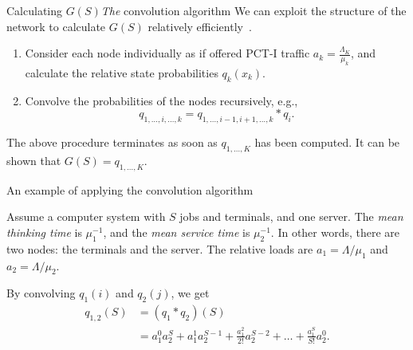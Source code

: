 \documentclass[serif, xcolor={svgnames, table}, usepdftitle=false]{beamer}
\begin{document}
\begin{frame}{Calculating $G(S)$}{\emph{The} convolution algorithm}
  We can exploit the structure of the network to calculate $G(S)$ relatively
  efficiently~\autocite{Buz73}.
  \begin{enumerate}
  \item Consider each node individually as if offered PCT-I traffic $a_k =
    \frac{\Lambda_K}{\mu_k}$, and calculate the relative state probabilities
    $q_k(x_k)$.
  \item Convolve the probabilities of the nodes recursively, e.g.,
    \begin{equation*}
      q_{1,\ldots,i,\ldots,k} = q_{1,\ldots,i - 1,i + 1,\ldots,k} \ast q_i\text{.}
    \end{equation*}
  \end{enumerate}
  The above procedure terminates as soon as $q_{1, \ldots, K}$ has been
  computed.  It can be shown that $G(S) = q_{1, \ldots, K}$.
\end{frame}

\begin{frame}{An example of applying the convolution algorithm}
  \begin{example}
    Assume a computer system with $S$ jobs and terminals, and one server.  The
    \emph{mean thinking time} is $\mu_1^{-1}$, and the \emph{mean service time}
    is $\mu_2^{-1}$.  In other words, there are two nodes: the terminals and the
    server.  The relative loads are $a_1 = \Lambda / {\mu_1}$ and
    $a_2 = \Lambda / {\mu_2}$.

    By convolving $q_1(i)$ and $q_2(j)$, we get
    \begin{align*}
      q_{1, 2}(S) &= (q_1 \ast q_2)(S) \\
                  &= a_1^0 a_2^S + a_1^1 a_2^{S - 1} + \frac{a_1^2}{2!} a_2^{S -
                    2} + \ldots + \frac{a_1^S}{S!} a_2^0\text{.}
    \end{align*}
  \end{example}
\end{frame}
\end{document}

